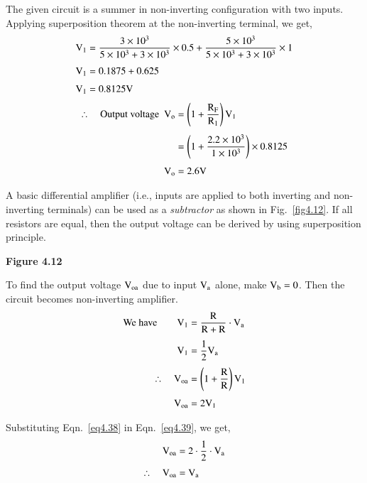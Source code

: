 \begin{solution}
The given circuit is a summer in non-inverting configuration with two inputs. Applying superposition theorem at the non-inverting terminal, we get,
\begin{align*}
\textrm{V}_{1} &= \frac{3\times 10^{3}}{5\times 10^{3}+3\times 10^{3}}\times 0.5 + \frac{5\times 10^{3}}{5\times 10^{3}+3\times 10^{3}}\times 1\\[4pt]
\textrm{V}_{1} &= 0.1875+0.625\\[3pt]
\textrm{V}_{1} &= 0.8125\textrm{V}
\end{align*}
\begin{align*}
\therefore\quad \text{Output voltage~ } \textrm{V}_{\textrm{o}} &= \left(1+\frac{\textrm{R}_{\textrm{F}}}{\textrm{R}_{1}}\right)\textrm{V}_{1}\\[4pt]
&= \left(1+\frac{2.2\times 10^{3}}{1\times 10^{3}}\right)\times 0.8125\\[3pt]
\textrm{V}_{\textrm{o}} &= 2.6\textrm{V}
\end{align*}
\end{solution}


A basic differential amplifier (i.e., inputs are applied to both inverting and non-inverting terminals) can be used as a {\em subtractor} as shown in Fig.~\ref{fig4.12}. If all resistors are equal, then the output voltage can be derived by using superposition principle.
\begin{center}
{\bf Figure 4.12}
\end{center}

To find the output voltage $\textrm{V}_{\textrm{o}\textrm{a}}$ due to input $\textrm{V}_{\textrm{a}}$ alone, make $\textrm{V}_{\textrm{b}}=0$. Then the circuit becomes non-inverting amplifier.
\begin{align}
\text{We have}\qquad \textrm{V}_{1} &= \frac{\textrm{R}}{\textrm{R}+\textrm{R}}\cdot \textrm{V}_{\textrm{a}}\notag\\[4pt]
\textrm{V}_{1} &= \frac{1}{2}\textrm{V}_{\textrm{a}}\label{eq4.38}\\[3pt]
\therefore\quad \textrm{V}_{\textrm{o}\textrm{a}} &= \left(1+\dfrac{\textrm{R}}{\textrm{R}}\right)\textrm{V}_{1}\notag\\[3pt]
\textrm{V}_{\textrm{o}\textrm{a}} &= 2\textrm{V}_{1}\label{eq4.39}
\end{align}

Substituting Eqn.~\eqref{eq4.38} in Eqn.~\eqref{eq4.39}, we get,
\begin{align}
\textrm{V}_{\textrm{o}\textrm{a}} &= 2\cdot \frac{1}{2}\cdot \textrm{V}_{\textrm{a}}\notag\\[3pt]
\therefore\quad \textrm{V}_{\textrm{o}\textrm{a}} &= \textrm{V}_{\textrm{a}}\label{eq4.40}
\end{align}

